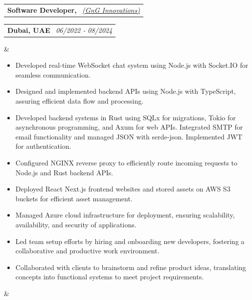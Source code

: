 \documentclass[11pt,a4paper,sans]{moderncv}
\makeatletter
\newcommand*{\customcventry}[7][0.13em]{
  \begin{tabular}{@{}l}
    {\bfseries #4} \
    {\itshape #3}
  \end{tabular}
  \hfill
  \begin{tabular}{l@{}}
    {\bfseries #5} \
    {\itshape #2}
  \end{tabular}
  \ifx&#7&
  \else{\
    \begin{minipage}{\maincolumnwidth}
      \small#7
  \end{minipage}}\fi
  \par\addvspace{#1}
}
\makeatother
\begin{document}
\customcventry{06/2022 ‐
08/2024}{{\color{blue}\href{https://gnginfotech.com/}{(GnG
Innovations)}}}{Software Developer,}{Dubai, UAE}{} {{
    \begin{itemize}[leftmargin=0.6cm, label={\textbullet}]
        \vspace{0.6em}
      \item Developed real-time WebSocket chat system using Node.js
        with Socket.IO for seamless communication.
      \item Designed and implemented backend APIs using Node.js with
        TypeScript, assuring efficient data flow and processing.
      \item Developed backend systems in Rust using SQLx for
        migrations, Tokio for asynchronous programming, and Axum for
        web APIs. Integrated SMTP for email functionality and managed
        JSON with serde-json. Implemented JWT for authentication.
      \item Configured NGINX reverse proxy to efficiently route
        incoming requests to Node.js and Rust backend APIs.
      \item Deployed React Next.js frontend websites and stored
        assets on AWS S3 buckets for efficient asset management.
      \item Managed Azure cloud infrastructure for deployment,
        ensuring scalability, availability, and security of applications.
      \item Led team setup efforts by hiring and onboarding new
        developers, fostering a collaborative and productive work environment.
      \item Collaborated with clients to brainstorm and refine
        product ideas, translating concepts into functional systems
        to meet project requirements.
    \end{itemize}
}}
\end{document}
